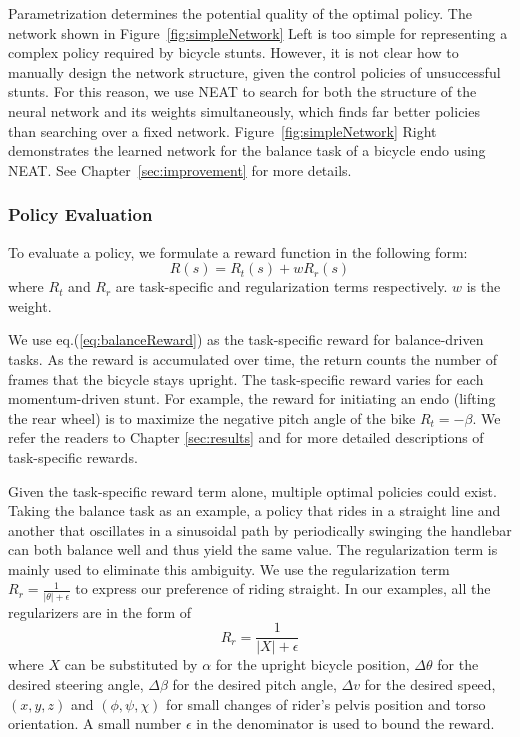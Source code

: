 Parametrization determines the potential quality of the optimal policy. The network shown in Figure~\ref{fig:simpleNetwork} Left is too simple for representing a complex policy required by bicycle stunts. However, it is not clear how to manually design the network structure, given the control policies of unsuccessful stunts. For this reason, we use NEAT to search for both the structure of the neural network and its weights simultaneously, which finds far better policies than searching over a fixed network. Figure~\ref{fig:simpleNetwork} Right demonstrates the learned network for the balance task of a bicycle endo using NEAT. See Chapter~\ref{sec:improvement} for more details.

\subsubsection{Policy Evaluation}
To evaluate a policy, we formulate a reward function in the following form:
\begin{equation}
R(s)=R_t(s)+wR_r(s)
\end{equation}
where $R_t$ and $R_r$ are task-specific and regularization terms respectively. $w$ is the weight.

We use eq.(\ref{eq:balanceReward}) as the task-specific reward for balance-driven tasks. As the reward is accumulated over time, the return counts the number of frames that the bicycle stays upright. The task-specific reward varies for each momentum-driven stunt. For example, the reward for initiating an endo (lifting the rear wheel) is to maximize the negative pitch angle of the bike $R_t=-\beta$. We refer the readers to Chapter \ref{sec:results} and for more detailed descriptions of task-specific rewards.

Given the task-specific reward term alone, multiple optimal policies could exist. Taking the balance task as an example, a policy that rides in a straight line and another that oscillates in a sinusoidal path by periodically swinging the handlebar can both balance well and thus yield the same value. The regularization term is mainly used to eliminate this ambiguity. We use the regularization term $R_r=\frac{1}{|\theta|+\epsilon}$ to express our preference of riding straight. In our examples, all the regularizers are in the form of
\begin{displaymath}
R_r = \frac{1}{|X|+\epsilon}
\end{displaymath}
where $X$ can be substituted by $\alpha$ for the upright bicycle position, $\Delta \theta$ for the desired steering angle, $\Delta \beta$ for the desired pitch angle, $\Delta v$ for the desired speed, $(x, y, z)$ and $(\phi, \psi, \chi)$ for small changes of rider's pelvis position and torso orientation. A small number $\epsilon$ in the denominator is used to bound the reward.

